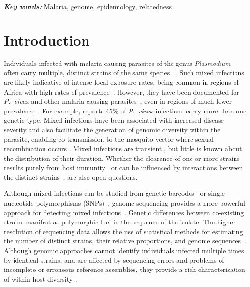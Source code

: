 \documentclass[9pt,lineno]{elife}
\providecommand{\keywords}[1]{\textbf{\textit{Key words:}} #1}
\begin{document}
\keywords{Malaria, genome, epidemiology, relatedness}


\section{Introduction}


Individuals infected with malaria-causing parasites of the genus {\it Plasmodium} often carry multiple, distinct strains of the same species ~\citep{Bell2006}.  Such mixed infections are likely indicative of intense local exposure rates, being common in regions of Africa with high rates of prevalence~\citep{Bhatt2015, Howes2016}. However, they have been documented for {\it P.~vivax} and other malaria-causing parasites~\citep{Mueller2007, Collins2012}, even in regions of much lower prevalence~\citep{Howes2016, Steenkeste2010}.  For example, \citet{Pearson2016} reports 45\% of {\it P.~vivax} infections carry more than one genetic type.  Mixed infections have been associated with increased disease severity \citep{deRoode2005} and also facilitate the generation of genomic diversity within the parasite, enabling co-transmission to the mosquito vector where sexual recombination occurs \citep{Mzilahowa2007}.  Mixed infections are transient \citep{Bruce2002, Zimmerman2004}, but little is known about the distribution of their duration. Whether the clearance of one or more strains results purely from host immunity~\citep{Borrmann2011} or can be influenced by interactions between the distinct strains~\citep{Enosse2006, Bushman2016}, are also open questions.

Although mixed infections can be studied from genetic barcodes~\citep{Galinsky2015} or single nucleotide polymorphisms (SNPs)~\citep{Jack2016}, genome sequencing provides a more powerful approach for detecting mixed infections~\citep{Chang2017}.  Genetic differences between co-existing strains manifest as polymorphic loci in the sequence of the isolate. The higher resolution of sequencing data allows the use of statistical methods for estimating the number of distinct strains, their relative proportions, and genome sequences~\citep{Zhu2017}.  Although genomic approaches cannot identify individuals infected multiple times by identical strains, and are affected by sequencing errors and problems of incomplete or erroneous reference assemblies, they provide a rich characterisation of within host diversity~\citep{Manske2012}.
\end{document}
